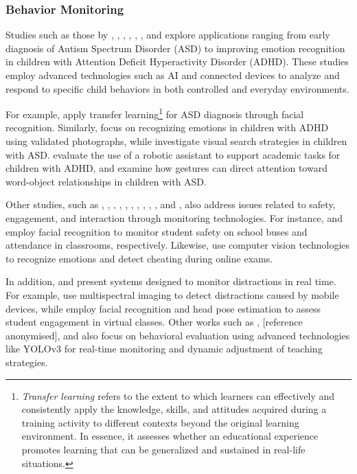 		\subsubsection{Behavior Monitoring}
			Studies such as those by \cite{Akter2021}, \cite{Albrecht2014}, \cite{Berrezueta-Guzman2021}, \cite{Pelc2006}, \cite{VilliersRader2021}, \cite{Warren2015Brief}, and \cite{Washington2016AWereable} explore applications ranging from early diagnosis of Autism Spectrum Disorder (ASD) to improving emotion recognition in children with Attention Deficit Hyperactivity Disorder (ADHD). These studies employ advanced technologies such as AI and connected devices to analyze and respond to specific child behaviors in both controlled and everyday environments.
			
			For example, \cite{Akter2021} apply transfer learning\footnote{\textit{Transfer learning \cite{Akter2021}} refers to the extent to which learners can effectively and consistently apply the knowledge, skills, and attitudes acquired during a training activity to different contexts beyond the original learning environment. In essence, it assesses whether an educational experience promotes learning that can be generalized and sustained in real-life situations.} for ASD diagnosis through facial recognition. Similarly, \cite{Pelc2006} focus on recognizing emotions in children with ADHD using validated photographs, while \cite{Albrecht2014} investigate visual search strategies in children with ASD. \cite{Berrezueta-Guzman2021} evaluate the use of a robotic assistant to support academic tasks for children with ADHD, and \cite{VilliersRader2021} examine how gestures can direct attention toward word-object relationships in children with ASD.
			
			Other studies, such as \cite{Boumiza2017}, \cite{DaCosta2023}, \cite{Enadula2021}, \cite{Farsani2020}, \cite{Hachad2020}, \cite{James2019}, \cite{Kulkarni2023}, \cite{Kumar2024Zoom}, \cite{Muller2018ArchnSmile}, \cite{Narkhede2023}, and \cite{Ozdamli2022}, also address issues related to safety, engagement, and interaction through monitoring technologies. For instance, \cite{Hachad2020} and \cite{James2019} employ facial recognition to monitor student safety on school buses and attendance in classrooms, respectively. Likewise, \cite{Ozdamli2022} use computer vision technologies to recognize emotions and detect cheating during online exams.
			
			In addition, \cite{Campbell2015Using} and \cite{Ucar2022Recognizing} present systems designed to monitor distractions in real time. For example, \cite{Campbell2015Using} use multispectral imaging to detect distractions caused by mobile devices, while \cite{Ucar2022Recognizing} employ facial recognition and head pose estimation to assess student engagement in virtual classes. Other works such as \cite{Argel2023Intellitell}, [reference anonymised], and \cite{Nguyen2019} also focus on behavioral evaluation using advanced technologies like YOLOv3 for real-time monitoring and dynamic adjustment of teaching strategies.
			

